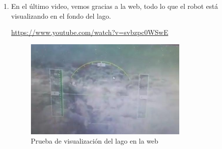 \begin{enumerate}
\item En el último video, vemos gracias a la web, todo lo que el robot está visualizando en el fondo del lago.
\begin{center}
\url{https://www.youtube.com/watch?v=svbzpc0WSwE}
 \end{center}
 
 \begin{figure} [hbtp]
  \begin{center}
    \includegraphics[width=8cm]{img/cap5/web}
  \end{center}
  \caption{Prueba de visualización del lago en la web}
  \label{fig:web}
 \end{figure} 


\end{enumerate}